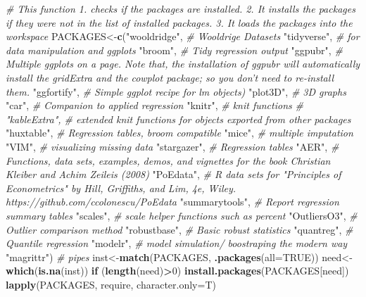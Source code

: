 \documentclass[]{book}
\newenvironment{Shaded}{\begin{snugshade}}{\end{snugshade}}
\newcommand{\CommentTok}[1]{\textcolor[rgb]{0.56,0.35,0.01}{\textit{#1}}}
\newcommand{\ControlFlowTok}[1]{\textcolor[rgb]{0.13,0.29,0.53}{\textbf{#1}}}
\newcommand{\DataTypeTok}[1]{\textcolor[rgb]{0.13,0.29,0.53}{#1}}
\newcommand{\DecValTok}[1]{\textcolor[rgb]{0.00,0.00,0.81}{#1}}
\newcommand{\KeywordTok}[1]{\textcolor[rgb]{0.13,0.29,0.53}{\textbf{#1}}}
\newcommand{\NormalTok}[1]{#1}
\newcommand{\OperatorTok}[1]{\textcolor[rgb]{0.81,0.36,0.00}{\textbf{#1}}}
\newcommand{\OtherTok}[1]{\textcolor[rgb]{0.56,0.35,0.01}{#1}}
\newcommand{\StringTok}[1]{\textcolor[rgb]{0.31,0.60,0.02}{#1}}
\begin{document}
\begin{Shaded}
\begin{Highlighting}[]
\CommentTok{# This function 1. checks if the packages are installed. 2. It installs the packages if they were not in the list of installed packages. 3. It loads the packages into the workspace}
\NormalTok{PACKAGES<-}\KeywordTok{c}\NormalTok{(}\StringTok{"wooldridge"}\NormalTok{,  }\CommentTok{# Wooldrige Datasets}
            \StringTok{"tidyverse"}\NormalTok{,  }\CommentTok{# for data manipulation and ggplots}
            \StringTok{"broom"}\NormalTok{,  }\CommentTok{# Tidy regression output}
            \StringTok{"ggpubr"}\NormalTok{,  }\CommentTok{# Multiple ggplots on a page. Note that, the installation of ggpubr will automatically install the gridExtra and the cowplot package; so you don’t need to re-install them. }
            \StringTok{"ggfortify"}\NormalTok{, }\CommentTok{# Simple ggplot recipe for lm objects) }
            \StringTok{"plot3D"}\NormalTok{,  }\CommentTok{#  3D graphs}
            \StringTok{"car"}\NormalTok{, }\CommentTok{# Companion to applied regression}
            \StringTok{"knitr"}\NormalTok{, }\CommentTok{# knit functions}
            \CommentTok{# "kableExtra", # extended knit functions for objects exported from other packages}
            \StringTok{"huxtable"}\NormalTok{, }\CommentTok{#  Regression tables, broom compatible}
            \StringTok{"mice"}\NormalTok{,  }\CommentTok{# multiple imputation}
            \StringTok{"VIM"}\NormalTok{, }\CommentTok{# visualizing missing data}
            \StringTok{"stargazer"}\NormalTok{, }\CommentTok{# Regression tables}
            \StringTok{"AER"}\NormalTok{, }\CommentTok{#  Functions, data sets, examples, demos, and vignettes for the book Christian Kleiber and Achim Zeileis (2008)}
            \StringTok{"PoEdata"}\NormalTok{, }\CommentTok{# R data sets for "Principles of Econometrics" by Hill, Griffiths, and Lim, 4e, Wiley. https://github.com/ccolonescu/PoEdata}
            \StringTok{"summarytools"}\NormalTok{, }\CommentTok{# Report regression summary tables}
            \StringTok{"scales"}\NormalTok{, }\CommentTok{# scale helper functions such as percent }
            \StringTok{"OutliersO3"}\NormalTok{, }\CommentTok{# Outlier comparison method}
            \StringTok{"robustbase"}\NormalTok{, }\CommentTok{# Basic robust statistics}
            \StringTok{"quantreg"}\NormalTok{, }\CommentTok{# Quantile regression}
            \StringTok{"modelr"}\NormalTok{, }\CommentTok{# model simulation/ boostraping the modern way}
            \StringTok{"magrittr"}\NormalTok{) }\CommentTok{#  pipes}
\NormalTok{inst<-}\KeywordTok{match}\NormalTok{(PACKAGES, }\KeywordTok{.packages}\NormalTok{(}\DataTypeTok{all=}\OtherTok{TRUE}\NormalTok{))}
\NormalTok{need<-}\KeywordTok{which}\NormalTok{(}\KeywordTok{is.na}\NormalTok{(inst))}
\ControlFlowTok{if}\NormalTok{ (}\KeywordTok{length}\NormalTok{(need)}\OperatorTok{>}\DecValTok{0}\NormalTok{) }\KeywordTok{install.packages}\NormalTok{(PACKAGES[need])}
\KeywordTok{lapply}\NormalTok{(PACKAGES, require, }\DataTypeTok{character.only=}\NormalTok{T)}
\end{Highlighting}
\end{Shaded}
\end{document}
